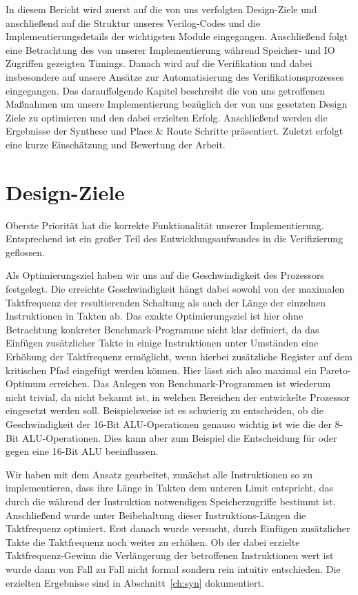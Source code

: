 \documentclass[ngerman, cd=lightcolor]{tudscrreprt}
\begin{document}
In diesem Bericht wird zuerst auf die von uns verfolgten Design-Ziele und
anschließend auf die Struktur unseres Verilog-Codes und die
Implementierungsdetails der wichtigsten Module eingegangen. Anschließend folgt
eine Betrachtung des von unserer Implementierung während Speicher- und IO
Zugriffen gezeigten Timings. Danach wird auf die Verifikation und dabei
insbesondere auf unsere Ansätze zur Automatisierung des Verifikationsprozesses
eingegangen.  Das darauffolgende Kapitel beschreibt die von uns getroffenen
Maßnahmen um unsere Implementierung bezüglich der von uns gesetzten Design
Ziele zu optimieren und den dabei erzielten Erfolg. Anschließend werden die
Ergebnisse der Synthese und Place \& Route Schritte präsentiert. Zuletzt
erfolgt eine kurze Einschätzung und Bewertung der Arbeit.

\chapter{Design-Ziele\label{ch:design-goals}}

Oberste Priorität hat die korrekte Funktionalität unserer Implementierung.
Entsprechend ist ein großer Teil des Entwicklungsaufwandes in die Verifizierung
geflossen.

Als Optimierungsziel haben wir uns auf die Geschwindigkeit des Prozessors
festgelegt. Die erreichte Geschwindigkeit hängt dabei sowohl von der maximalen
Taktfrequenz der resultierenden Schaltung als auch der Länge der einzelnen
Instruktionen in Takten ab. Das exakte Optimierungsziel ist hier ohne
Betrachtung konkreter Benchmark-Programme nicht klar definiert, da das Einfügen
zusätzlicher Takte in einige Instruktionen unter Umständen eine Erhöhung
der Taktfrequenz ermöglicht, wenn hierbei zusätzliche Register auf dem
kritischen Pfad eingefügt werden können. Hier lässt sich also maximal ein
Pareto-Optimum erreichen. Das Anlegen von Benchmark-Programmen ist wiederum
nicht trivial, da nicht bekannt ist, in welchen Bereichen der entwickelte
Prozessor eingesetzt werden soll.  Beispielsweise ist es schwierig zu
entscheiden, ob die Geschwindigkeit der 16-Bit ALU-Operationen genauso wichtig
ist wie die der 8-Bit ALU-Operationen.  Dies kann aber zum Beispiel die
Entscheidung für oder gegen eine 16-Bit ALU beeinflussen.

Wir haben mit dem Ansatz gearbeitet, zunächst alle Instruktionen so zu
implementieren, dass ihre Länge in Takten dem unteren Limit entspricht, das
durch die während der Instruktion notwendigen Speicherzugriffe bestimmt ist.
Anschließend wurde unter Beibehaltung dieser Instruktions-Längen die
Taktfrequenz optimiert. Erst danach wurde versucht, durch Einfügen zusätzlicher
Takte die Taktfrequenz noch weiter zu erhöhen. Ob der dabei erzielte
Taktfrequenz-Gewinn die Verlängerung der betroffenen Instruktionen wert ist
wurde dann von Fall zu Fall nicht formal sondern rein intuitiv entschieden.
Die erzielten Ergebnisse sind in Abschnitt~\ref{ch:syn} dokumentiert.
\end{document}
